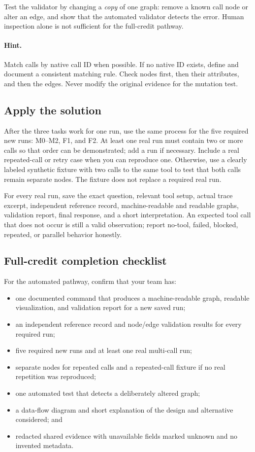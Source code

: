 \documentclass[11pt]{article}
\begin{document}
Test the validator by changing a \emph{copy} of one graph: remove a known call node or alter an edge, and show that the automated validator detects the error. Human inspection alone is not sufficient for the full-credit pathway.

\paragraph{Hint.}
Match calls by native call ID when possible. If no native ID exists, define and document a consistent matching rule. Check nodes first, then their attributes, and then the edges. Never modify the original evidence for the mutation test.

\subsection{Apply the solution}
After the three tasks work for one run, use the same process for the five required new runs: M0--M2, F1, and F2. At least one real run must contain two or more calls so that order can be demonstrated; add a run if necessary. Include a real repeated-call or retry case when you can reproduce one. Otherwise, use a clearly labeled synthetic fixture with two calls to the same tool to test that both calls remain separate nodes. The fixture does not replace a required real run.

For every real run, save the exact question, relevant tool setup, actual trace excerpt, independent reference record, machine-readable and readable graphs, validation report, final response, and a short interpretation. An expected tool call that does not occur is still a valid observation; report no-tool, failed, blocked, repeated, or parallel behavior honestly.

\subsection*{Full-credit completion checklist}
For the automated pathway, confirm that your team has:
\begin{itemize}
  \item one documented command that produces a machine-readable graph, readable visualization, and validation report for a new saved run;
  \item an independent reference record and node/edge validation results for every required run;
  \item five required new runs and at least one real multi-call run;
  \item separate nodes for repeated calls and a repeated-call fixture if no real repetition was reproduced;
  \item one automated test that detects a deliberately altered graph;
  \item a data-flow diagram and short explanation of the design and alternative considered; and
  \item redacted shared evidence with unavailable fields marked unknown and no invented metadata.
\end{itemize}
\end{document}
